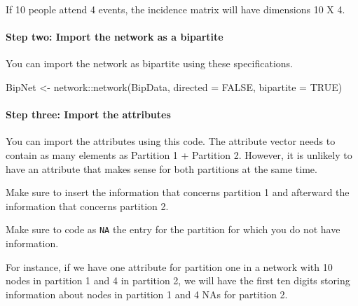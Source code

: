 \documentclass[
]{article}
\newenvironment{Shaded}{\begin{snugshade}}{\end{snugshade}}
\newcommand{\AttributeTok}[1]{\textcolor[rgb]{0.77,0.63,0.00}{#1}}
\newcommand{\ConstantTok}[1]{\textcolor[rgb]{0.00,0.00,0.00}{#1}}
\newcommand{\FunctionTok}[1]{\textcolor[rgb]{0.00,0.00,0.00}{#1}}
\newcommand{\NormalTok}[1]{#1}
\newcommand{\OtherTok}[1]{\textcolor[rgb]{0.56,0.35,0.01}{#1}}
\newcommand{\SpecialCharTok}[1]{\textcolor[rgb]{0.00,0.00,0.00}{#1}}
\begin{document}
If 10 people attend 4 events, the incidence matrix will have dimensions
10 X 4.

\hypertarget{step-two-import-the-network-as-a-bipartite}{%
\paragraph{Step two: Import the network as a
bipartite}\label{step-two-import-the-network-as-a-bipartite}}

You can import the network as bipartite using these specifications.

\begin{Shaded}
\begin{Highlighting}[]

\NormalTok{BipNet }\OtherTok{\textless{}{-}}\NormalTok{ network}\SpecialCharTok{::}\FunctionTok{network}\NormalTok{(BipData, }\AttributeTok{directed =} \ConstantTok{FALSE}\NormalTok{, }\AttributeTok{bipartite =} \ConstantTok{TRUE}\NormalTok{)}
\end{Highlighting}
\end{Shaded}

\hypertarget{step-three-import-the-attributes}{%
\paragraph{Step three: Import the
attributes}\label{step-three-import-the-attributes}}

You can import the attributes using this code. The attribute vector
needs to contain as many elements as Partition 1 + Partition 2. However,
it is unlikely to have an attribute that makes sense for both partitions
at the same time.

Make sure to insert the information that concerns partition 1 and
afterward the information that concerns partition 2.

Make sure to code as \texttt{NA} the entry for the partition for which
you do not have information.

For instance, if we have one attribute for partition one in a network
with 10 nodes in partition 1 and 4 in partition 2, we will have the
first ten digits storing information about nodes in partition 1 and 4
NAs for partition 2.
\end{document}
